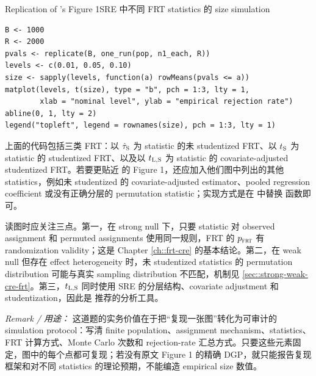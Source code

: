 \begin{exercisesolution}{Replication of \citet{zhao2020caFRT}'s Figure 1}{SRE 中不同 FRT statistics 的 size simulation}
\begin{lstlisting}
B <- 1000
R <- 2000
pvals <- replicate(B, one_run(pop, n1_each, R))
levels <- c(0.01, 0.05, 0.10)
size <- sapply(levels, function(a) rowMeans(pvals <= a))
matplot(levels, t(size), type = "b", pch = 1:3, lty = 1,
        xlab = "nominal level", ylab = "empirical rejection rate")
abline(0, 1, lty = 2)
legend("topleft", legend = rownames(size), pch = 1:3, lty = 1)
\end{lstlisting}

上面的代码包括三类 FRT：以 $\hat\tau_\textsc{S}$ 为 statistic 的未 studentized FRT、以 $t_\textsc{S}$ 为 statistic 的 studentized FRT、以及以 $t_{\textsc{L},\textsc{S}}$ 为 statistic 的 covariate-adjusted studentized FRT。若要更贴近 \citet{zhao2020caFRT} 的 Figure 1，还应加入他们图中列出的其他 statistics，例如未 studentized 的 covariate-adjusted estimator、pooled regression coefficient 或没有正确分层的 permutation statistic；实现方式是在  中替换  函数即可。

读图时应关注三点。第一，在 strong null 下，只要 statistic 对 observed assignment 和 permuted assignments 使用同一规则，FRT 的 $p_{\textsc{frt}}$ 有 randomization validity；这是 Chapter \ref{ch::frt-cre} 的基本结论。第二，在 weak null 但存在 effect heterogeneity 时，未 studentized statistics 的 permutation distribution 可能与真实 sampling distribution 不匹配，机制见 \cref{sec::strong-weak-cre-frt}。第三，$t_{\textsc{L},\textsc{S}}$ 同时使用 SRE 的分层结构、covariate adjustment 和 studentization，因此是 \citet{zhao2020caFRT} 推荐的分析工具。

\emph{Remark / 用途：} 这道题的实务价值在于把“复现一张图”转化为可审计的 simulation protocol：写清 finite population、assignment mechanism、statistics、FRT 计算方式、Monte Carlo 次数和 rejection-rate 汇总方式。只要这些元素固定，图中的每个点都可复现；若没有原文 Figure 1 的精确 DGP，就只能报告复现框架和对不同 statistics 的理论预期，不能编造 empirical size 数值。
\end{exercisesolution}
